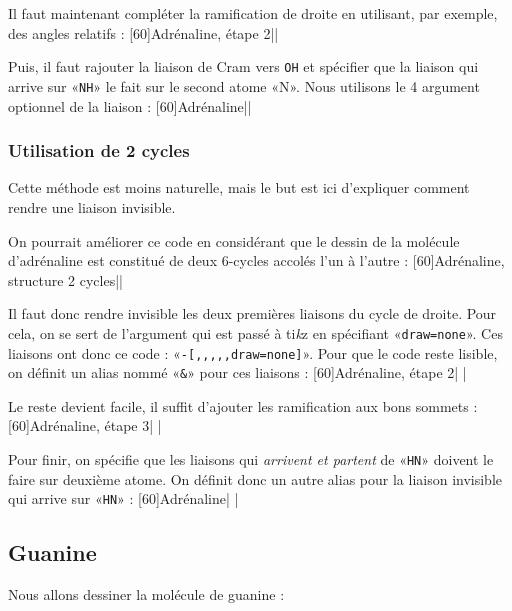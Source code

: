 \documentclass[10pt,french]{article}
\makeatletter
\newcommand\make@car@active[1]{%
	\catcode`#1\active
	\begingroup
		\lccode`\~`#1\relax
		\lowercase{\endgroup\def~}%
}
\newif\if@exstar
\newcommand\exemple{%
	\begingroup
	\parskip\z@
	\@makeother\;\@makeother\!\@makeother\?\@makeother\:%
	\@ifstar{\@exstartrue\exemple@}{\@exstarfalse\exemple@}}
\newcommand\exemple@[2][65]{%
	\medbreak\noindent
	\begingroup
		\let\do\@makeother\dospecials
		\make@car@active\ { {}}%
		\make@car@active\^^M{\par\leavevmode}%
		\make@car@active\^^I{\space\space}%
		\make@car@active\,{\leavevmode\kern\z@\string,}%
		\make@car@active\-{\leavevmode\kern\z@\string-}%
		\make@car@active\>{\leavevmode\kern\z@\string>}%
		\make@car@active\<{\leavevmode\kern\z@\string<}%
		\exemple@@{#1}{#2}%
}
\newcommand\exemple@@[3]{%
	\def\@tempa##1#3{\exemple@@@{#1}{#2}{##1}}%
	\@tempa
}
\newcommand\exemple@@@[3]{%
	\xdef\the@code{#3}%
	\endgroup
	\if@exstar
		\begingroup
			\fboxrule0.4pt
			\let\breakboxparindent\z@
			\def\bkvz@bottom{\hrule\@height\fboxrule}%
			\let\bkvz@before@breakbox\relax
			\def\bkvz@set@linewidth{\advance\linewidth\dimexpr-2\fboxrule-2\fboxsep}%
			\def\bkvz@left{\vrule\@width\fboxrule\hskip\fboxsep}%
			\def\bkvz@right{\hskip\fboxsep\vrule\@width\fboxrule}%
			\def\bkvz@top{\hbox to \hsize{%
				\vrule\@width\fboxrule\@height\fboxrule
				\leaders\bkvz@bottom\hfill
				\sffamily
				\fboxsep\z@
				\colorbox{black}{\kern0.25em\color{white}\footnotesize\lower0.5ex\hbox{\strut#2}\kern0.25em}%
				\leaders\bkvz@bottom\hfill
				\vrule\@width\fboxrule\@height\fboxrule}}%
			\breakbox
				\kern.5ex\relax
				\ttfamily\footnotesize\the@code\par
				\normalfont
				\kern3pt
				\hrule height0.1pt width\linewidth depth0.1pt
				\vskip5pt
				\rightskip0pt plus 1fill
				\everypar{{\color{lightgray}\rlap{\vrule height0.1pt width\linewidth depth0.1pt}}\hskip0pt plus 1fill}%
				\newlinechar`\^^M\everyeof{\noexpand}\scantokens{#3}\par
			\endbreakbox
		\endgroup
	\else
		\vskip0.5ex
		\boxput*(0,1)
			{\fboxsep\z@
			\hbox{\sffamily\colorbox{black}{\leavevmode\kern0.25em{\color{white}\footnotesize\strut#2}\kern0.25em}}%
			}%
			{\fboxsep5pt
			\fbox{%
				$\vcenter{\hsize\dimexpr0.#1\linewidth-\fboxsep-\fboxrule\relax
					\kern5pt\parskip0pt \ttfamily\footnotesize\the@code}%
				\vcenter{\kern5pt\hsize\dimexpr\linewidth-0.#1\linewidth-\fboxsep-\fboxrule\relax
					\everypar{{\color{lightgray}\rlap{\vrule height0.1pt width\dimexpr\linewidth-0.#1\linewidth-\fboxsep-\fboxrule depth0.1pt}}}%
					\footnotesize\newlinechar`\^^M\everyeof{\noexpand}\scantokens{#3}}$%
				}%
			}%
	\fi
	\medbreak
	\endgroup
}
\let\do\@makeother\dospecials
\newcommand\TIKZ{ti\textit kz\xspace}
\makeatother
\begin{document}
Il faut maintenant compléter la ramification de droite en utilisant, par exemple, des angles relatifs :
\exemple[60]{Adrénaline, étape 2}||

Puis, il faut rajouter la liaison de Cram vers \verb-OH- et spécifier que la liaison qui arrive sur «\verb-NH-» le fait sur le second atome «N». Nous utilisons le 4\ieme{} argument optionnel de la liaison :
\exemple[60]{Adrénaline}||

\subsubsection{Utilisation de 2 cycles}
Cette méthode est moins naturelle, mais le but est ici d'expliquer comment rendre une liaison invisible.

On pourrait améliorer ce code en considérant que le dessin de la molécule d'adrénaline est constitué de deux 6-cycles accolés l'un à l'autre :
\exemple[60]{Adrénaline, structure 2 cycles}||

Il faut donc rendre invisible les deux premières liaisons du cycle de droite. Pour cela, on se sert de l'argument qui est passé à \TIKZ en spécifiant «\verb-draw=none-». Ces liaisons ont donc ce code : «\verb/-[,,,,,draw=none]/». Pour que le code reste lisible, on définit un alias nommé «\verb-&-» pour ces liaisons :
\exemple[60]{Adrénaline, étape 2}|
|

Le reste devient facile, il suffit d'ajouter les ramification aux bons sommets :
\exemple[60]{Adrénaline, étape 3}|
|

Pour finir, on spécifie que les liaisons qui \emph{arrivent et partent} de «\verb-HN-» doivent le faire sur deuxième atome. On définit donc un autre alias pour la liaison invisible qui arrive sur «\verb-HN-» :
\exemple[60]{Adrénaline}|
|

\subsection{Guanine}
Nous allons dessiner la molécule de guanine :
\medskip
\end{document}
